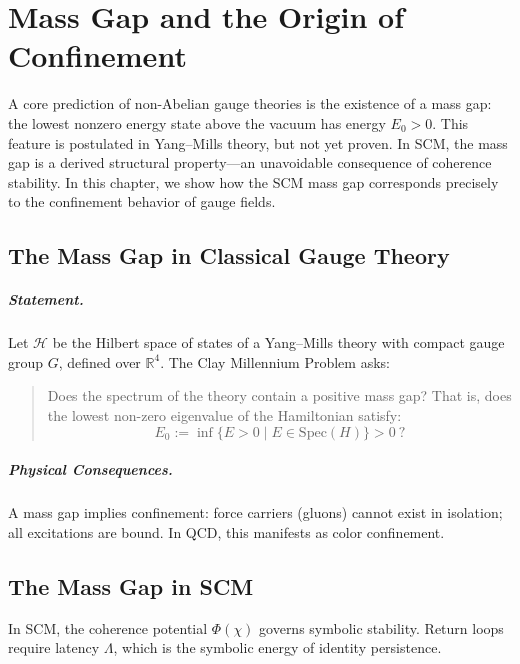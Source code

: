 \chapter{Mass Gap and the Origin of Confinement} \label{chapter-mass-gap-confinement}

A core prediction of non-Abelian gauge theories is the existence of a mass gap: the lowest nonzero energy state above the vacuum has energy \( E_0 > 0 \). This feature is postulated in Yang--Mills theory, but not yet proven. In SCM, the mass gap is a derived structural property—an unavoidable consequence of coherence stability. In this chapter, we show how the SCM mass gap corresponds precisely to the confinement behavior of gauge fields.

\section{The Mass Gap in Classical Gauge Theory}

\paragraph{Statement.}
Let \( \mathcal{H} \) be the Hilbert space of states of a Yang--Mills theory with compact gauge group \( G \), defined over \( \mathbb{R}^4 \). The Clay Millennium Problem asks:

\begin{quote}
Does the spectrum of the theory contain a positive mass gap? That is, does the lowest non-zero eigenvalue of the Hamiltonian satisfy:
\[
E_0 := \inf \{ E > 0 \mid E \in \text{Spec}(H) \} > 0 \ ?
\]
\end{quote}

\paragraph{Physical Consequences.}
A mass gap implies confinement: force carriers (gluons) cannot exist in isolation; all excitations are bound. In QCD, this manifests as color confinement.

\section{The Mass Gap in SCM}

In SCM, the coherence potential \( \Phi(\chi) \) governs symbolic stability. Return loops require latency \( \Lambda \), which is the symbolic energy of identity persistence.

